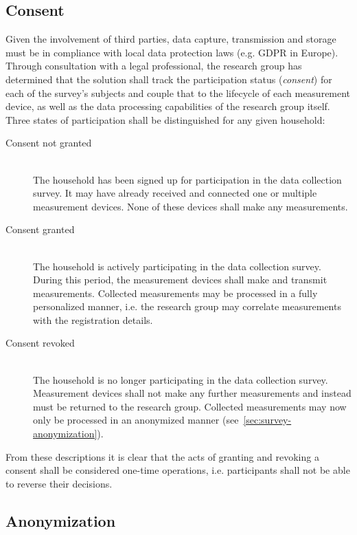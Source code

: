 \subsection{Consent}
\label{sec:survey-consent}

Given the involvement of third parties, data capture, transmission and storage must be in compliance with local data protection laws (e.g. \acs{GDPR} in Europe). Through consultation with a legal professional, the research group has determined that the solution shall track the participation status (\textit{consent}) for each of the survey's subjects and couple that to the lifecycle of each measurement device, as well as the data processing capabilities of the research group itself. Three states of participation shall be distinguished for any given household:

\begin{description}
  \item[Consent not granted]
  \hfill \\
  The household has been signed up for participation in the data collection survey. It may have already received and connected one or multiple measurement devices. None of these devices shall make any measurements.

  \item[Consent granted]
  \hfill \\
  The household is actively participating in the data collection survey. During this period, the measurement devices shall make and transmit measurements. Collected measurements may be processed in a fully personalized manner, i.e. the research group may correlate measurements with the registration details.

  \item[Consent revoked]
  \hfill \\
  The household is no longer participating in the data collection survey. Measurement devices shall not make any further measurements and instead must be returned to the research group. Collected measurements may now only be processed in an anonymized manner (see~\autoref{sec:survey-anonymization}).
\end{description}

From these descriptions it is clear that the acts of granting and revoking a consent shall be considered one-time operations, i.e. participants shall not be able to reverse their decisions.


\subsection{Anonymization}
\label{sec:survey-anonymization}

